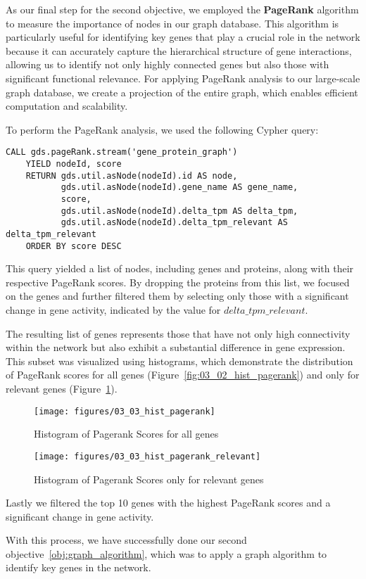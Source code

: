 
As our final step for the second objective, we employed the \textbf{PageRank} algorithm to measure the importance of nodes in our graph database.
This algorithm is particularly useful for identifying key genes that play a crucial role in the network
because it can accurately capture the hierarchical structure of gene interactions,
allowing us to identify not only highly connected genes but also those with significant functional relevance.
For applying PageRank analysis to our large-scale graph database,
we create a projection of the entire graph, which enables efficient computation and scalability.

To perform the PageRank analysis, we used the following Cypher query:

\begin{lstlisting}[language=Cypher, label={lst:pagerank}]
    CALL gds.pageRank.stream('gene_protein_graph')
    YIELD nodeId, score
    RETURN gds.util.asNode(nodeId).id AS node,
           gds.util.asNode(nodeId).gene_name AS gene_name,
           score,
           gds.util.asNode(nodeId).delta_tpm AS delta_tpm,
           gds.util.asNode(nodeId).delta_tpm_relevant AS delta_tpm_relevant
    ORDER BY score DESC
\end{lstlisting}

This query yielded a list of nodes, including genes and proteins, along with their respective PageRank scores.
By dropping the proteins from this list, we focused on the genes and
further filtered them by selecting only those with a significant change in gene activity,
indicated by the value for $delta\_tpm\_relevant$.

The resulting list of genes represents those that have not only high connectivity
within the network but also exhibit a substantial difference in gene expression.
This subset was visualized using histograms, which demonstrate the distribution of PageRank scores for all genes
(Figure~\ref{fig:03_02_hist_pagerank}) and only for relevant genes (Figure~\ref{fig:03_02_hist_pagerank_relevant}).

\begin{figure}[h]
    \texttt{[image: figures/03\_03\_hist\_pagerank]}
    \caption{Histogram of Pagerank Scores for all genes}
	\label{fig:03_02_hist_pagerank}
\endminipage
\hfill
{}
  \texttt{[image: figures/03\_03\_hist\_pagerank\_relevant]}
  \caption{Histogram of Pagerank Scores only for relevant genes}
	\label{fig:03_02_hist_pagerank_relevant}
\endminipage
\end{figure}

Lastly we filtered the top 10 genes with the highest PageRank scores and a significant change in gene activity.


With this process, we have successfully done our second objective~\ref{obj:graph_algorithm},
which was to apply a graph algorithm to identify key genes in the network.


